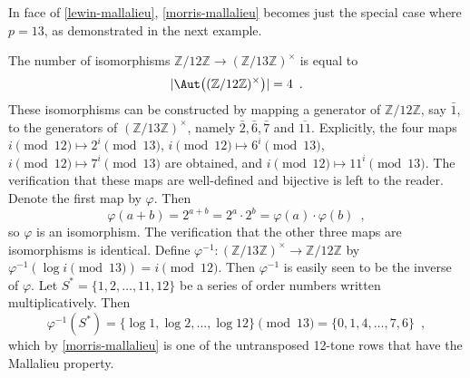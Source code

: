 In face of \ref{lewin-mallalieu}, \ref{morris-mallalieu} becomes just the special case where $p = 13$, as demonstrated in the next example.

\begin{example}
	\cite[8]{Lewin1976a}
	\cite[9]{Babbitt1976}
	The number of isomorphisms $\mathbb{Z} / 12 \mathbb{Z} \to (\mathbb{Z} / 13 \mathbb{Z})^\times$ is equal to
	\begin{equation}
		|\Aut\big((\mathbb{Z} / 12 \mathbb{Z})^\times\big)| = 4 \enspace.
	\end{equation}
	These isomorphisms can be constructed by mapping a generator of $\mathbb{Z} / 12 \mathbb{Z}$, say $\bar{1}$, to the generators of $(\mathbb{Z} / 13 \mathbb{Z})^\times$, namely $\bar{2}, \bar{6}, \bar{7}$ and $\overline{11}$. Explicitly, the four maps $i \pmod{12} \mapsto 2^i \pmod{13}$, $i \pmod{12} \mapsto 6^i \pmod{13}$, $i \pmod{12} \mapsto 7^i \pmod{13}$ are obtained, and $i \pmod{12} \mapsto 11^i \pmod{13}$. The verification that these maps are well-defined and bijective is left to the reader. Denote the first map by $\varphi$. Then
	\begin{equation}
		\varphi(a + b) = 2^{a + b} = 2^a \cdot 2^b = \varphi(a) \cdot \varphi(b) \enspace,
	\end{equation}
	so $\varphi$ is an isomorphism. The verification that the other three maps are isomorphisms is identical. Define $\varphi^{-1} : (\mathbb{Z} / 13 \mathbb{Z})^\times \to \mathbb{Z} / 12 \mathbb{Z}$ by $\varphi^{-1}(\log i \pmod{13}) = i \pmod{12}$. Then $\varphi^{-1}$ is easily seen to be the inverse of $\varphi$. Let $S^* = \{ 1, 2, \dots, 11, 12 \}$ be a series of order numbers written multiplicatively. Then
	\begin{equation}
		\varphi^{-1}(S^*) = \{ \log 1, \log 2, \dots, \log 12 \} \pmod{13} = \{ 0, 1, 4, \dots, 7, 6 \} \enspace,
	\end{equation}
	which by \ref{morris-mallalieu} is one of the untransposed 12-tone rows that have the Mallalieu property.
\end{example}
